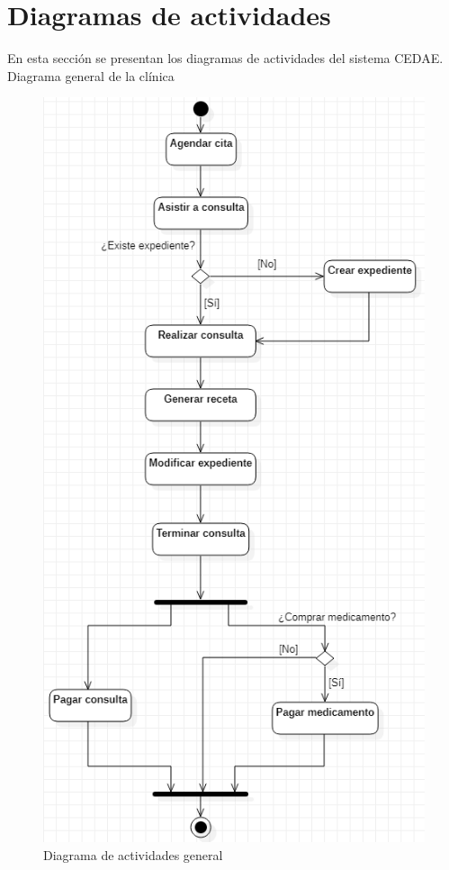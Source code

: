 \documentclass[12pt,letterpaper]{article}
\begin{document}
    \newpage
    \section{Diagramas de actividades}
    En esta sección se presentan los diagramas de actividades del sistema CEDAE.
        \newline
        Diagrama general de la clínica
        \begin{figure}[H]
            \centering
            \includegraphics [scale=0.6]{actividades/general}
            \caption{Diagrama de actividades general}
        \end{figure}
\end{document}
